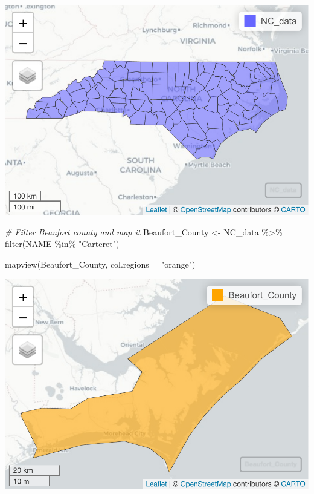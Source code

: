 \documentclass[
  12pt,
]{article}
\newenvironment{Shaded}{\begin{snugshade}}{\end{snugshade}}
\newcommand{\AttributeTok}[1]{\textcolor[rgb]{0.77,0.63,0.00}{#1}}
\newcommand{\CommentTok}[1]{\textcolor[rgb]{0.56,0.35,0.01}{\textit{#1}}}
\newcommand{\FunctionTok}[1]{\textcolor[rgb]{0.00,0.00,0.00}{#1}}
\newcommand{\NormalTok}[1]{#1}
\newcommand{\OtherTok}[1]{\textcolor[rgb]{0.56,0.35,0.01}{#1}}
\newcommand{\SpecialCharTok}[1]{\textcolor[rgb]{0.00,0.00,0.00}{#1}}
\newcommand{\StringTok}[1]{\textcolor[rgb]{0.31,0.60,0.02}{#1}}
\begin{document}
\includegraphics{Project_Template_TLK_files/figure-latex/Map of Beaufort-3.pdf}

\begin{Shaded}
\begin{Highlighting}[]
\CommentTok{\# Filter Beaufort county and map it }
\NormalTok{Beaufort\_County }\OtherTok{\textless{}{-}}\NormalTok{ NC\_data }\SpecialCharTok{\%\textgreater{}\%} 
  \FunctionTok{filter}\NormalTok{(NAME }\SpecialCharTok{\%in\%} \StringTok{"Carteret"}\NormalTok{)}

\FunctionTok{mapview}\NormalTok{(Beaufort\_County, }\AttributeTok{col.regions =} \StringTok{"orange"}\NormalTok{)}
\end{Highlighting}
\end{Shaded}

\includegraphics{Project_Template_TLK_files/figure-latex/Map of Beaufort-4.pdf}
\end{document}
